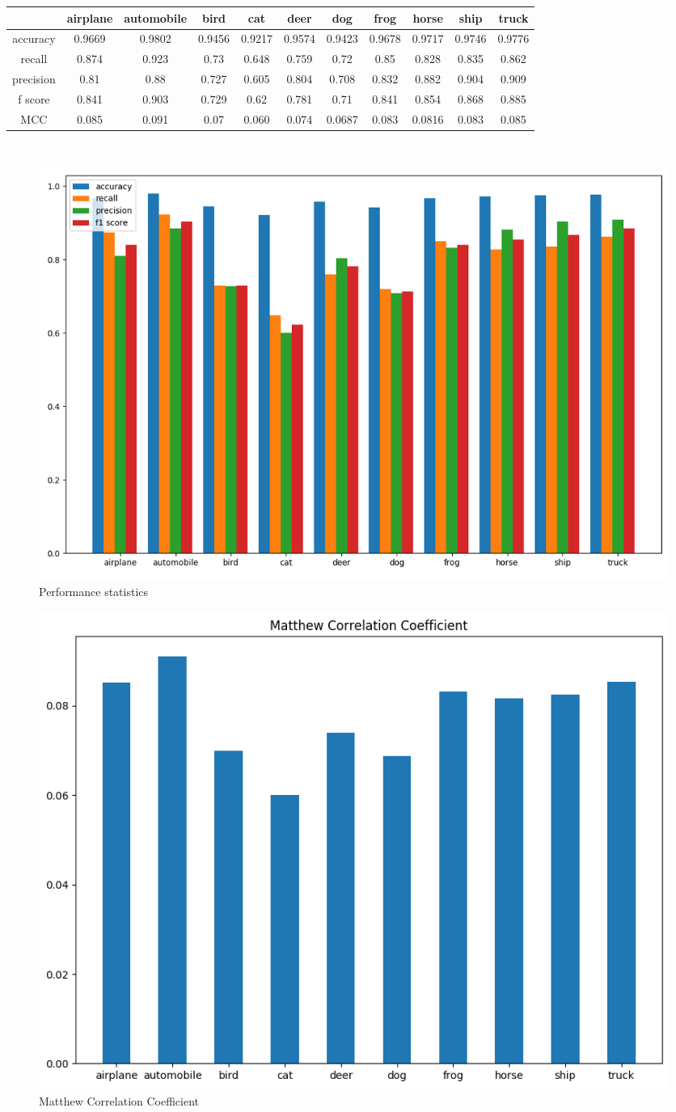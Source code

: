 \documentclass[journal,onecolumn]{IEEEtran}
\begin{document}
\begin{tabular}{*{11}{c}}
  \hline
  {} & airplane & automobile & bird & cat & deer & dog & frog & horse & ship & truck\\
  \hline
  accuracy & 0.9669 & 0.9802 & 0.9456 & 0.9217 & 0.9574 & 0.9423 & 0.9678 & 0.9717 & 0.9746 & 0.9776\\
  recall & 0.874 & 0.923 & 0.73 & 0.648 & 0.759 & 0.72 & 0.85 & 0.828 & 0.835 & 0.862\\
  precision & 0.81 & 0.88 & 0.727 & 0.605 & 0.804 & 0.708 & 0.832 & 0.882 & 0.904 & 0.909\\
  f score & 0.841 & 0.903 & 0.729 & 0.62 & 0.781 &  0.71 & 0.841 & 0.854 & 0.868 & 0.885\\
  MCC & 0.085 & 0.091 & 0.07 & 0.060 & 0.074 & 0.0687 & 0.083 & 0.0816 & 0.083 & 0.085\\
  \hline
\end{tabular}\\

\begin{figure}[!t]
\includegraphics[width=0.6\paperwidth]{images/stat}
\caption{Performance statistics}
\end{figure}

\begin{figure}[!t]
\includegraphics[width=0.6\paperwidth]{images/mcc}
\caption{Matthew Correlation Coefficient}
\end{figure}
\end{document}
